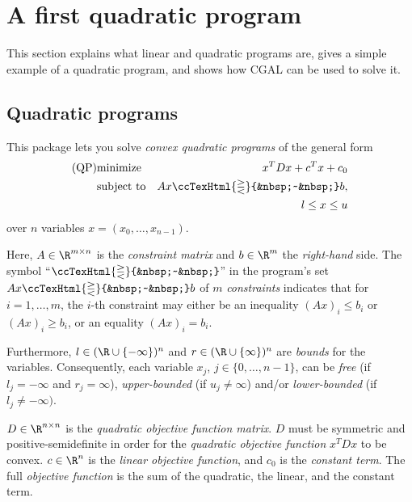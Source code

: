 \newcommand{\qprel}{\ccTexHtml{\gtreqless}{&nbsp;~&nbsp;}}

\label{QP_solver}

\section{A first quadratic program}
This section explains what linear and quadratic programs are, gives a
simple example of a quadratic program, and shows how CGAL can be used
to solve it.

\subsection{Quadratic programs}
This package lets you solve \emph{convex quadratic programs} of the 
general form
\begin{eqnarray*}
\mbox{(QP)}&\mbox{minimize} & x^{T}Dx + c^{T}x + c_0 \\
&\mbox{subject to}   & Ax\qprel b, \\
&& l \leq x \leq u
\end{eqnarray*}
over $n$ variables $x=(x_0,\ldots,x_{n-1})$.

Here, $A \in \R^{m \times n}$ is the \emph{constraint matrix} and $b
\in \R^{m}$ the \emph{right-hand} side. The symbol ``$\qprel$'' in the
program's set $Ax \qprel b$ of $m$ \emph{constraints} indicates that for
$i=1,\ldots,m$, the $i$-th constraint may either be an inequality
$(Ax)_i \leq b_i$ or $(Ax)_i \geq b_i$, or an equality $(Ax)_i = b_i$.

Furthermore, $l\in
(\R\cup\{-\infty\})^n$ and $r\in (\R\cup\{\infty\})^n$ are \emph{bounds}
for the variables. Consequently, each
variable $x_j$, $j\in\{0,\ldots,n-1\}$, can be \emph{free} (if
$l_j=-\infty$ and $r_j=\infty$), \emph{upper-bounded} (if
$u_j\neq\infty$) and/or \emph{lower-bounded} (if
$l_j\neq-\infty)$.  

$D \in \R^{n \times n}$ is the \emph{quadratic
objective function matrix}. $D$ must be symmetric and 
positive-semidefinite in order for the \emph{quadratic objective function}
$x^{T}Dx$ to be convex. $c \in \R^{n}$ is the \emph{linear
objective function}, and $c_0$ is the \emph{constant term}. The full
\emph{objective function} is the sum of the quadratic, the linear, and
the constant term.


